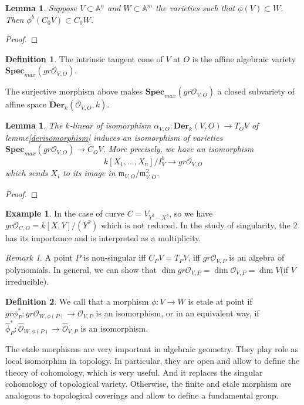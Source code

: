 \documentclass[12pt,a4paper,english]{article}
\theoremstyle{plain}
\newtheorem{lem}[thm]{Lemma}
\theoremstyle{definition}
\newtheorem{defi}{Definition}
\newtheorem*{example}{Example}
\theoremstyle{remark}
\newtheorem*{rem}{Remark}
\newcommand{\spm}{\mathbf{Spec}_{max}}
\newcommand{\der}{\textbf{Der}}
\begin{document}
\begin{lem}
Suppose $V\subset \mathbb{A}^{n}$ and $W\subset \mathbb{A}^{m}$ the varieties such that $\phi(V)\subset W$. Then $\phi^{b}(C_{0}V)\subset C_{0}W$. 
\end{lem}
\begin{proof}

\end{proof}
\begin{defi}
The intrinsic tangent cone of $V$ at $O$ is the affine algebraic variety $\spm(gr \mathcal{O}_{V,O})$.
\end{defi}
The surjective morphism above makes    $\spm(gr \mathcal{O}_{V,O})$ a closed subvariety of affine space $\der_{k}(\mathcal{O}_{V,O},k)$. 
\begin{lem}
The $k$-linear of isomorphism $\alpha_{V,O}:\der_{k}(V,O)\rightarrow T_{O}V$ of lemme\ref{derisomorphism} induces an isomorphism of varieties $\spm(gr \mathcal{O}_{V,O})\rightarrow C_{O}V$. More precisely, we have an isomorphism 
\begin{equation*}
    k[X_{1},...,X_{n}]/I^{b}_{V}\rightarrow gr \mathcal{O}_{V,O}
\end{equation*}
which sends $X_{i}$ to its image in $\mathfrak{m}_{V,O}/\mathfrak{m}^{2}_{V,O}$.
\end{lem}
\begin{proof}

\end{proof}
\begin{example}
In the case of curve $C=V_{Y^{2}-X^{3}}$, so we have $gr \mathcal{O}_{C,O}=k[X,Y]/(Y^{2})$ which is not reduced. In the study of singularity, the 2 has its importance and is interpreted as a multiplicity.
\end{example}
\begin{rem}
A point $P$ is non-singular iff $C_{P}V=T_{P}V$, iff $gr \mathcal{O}_{V,P}$ is an algebra of polynomials. In general, we can show that $\dim gr \mathcal{O}_{V,P}=\dim \mathcal{O}_{V,P}=\dim V$(if $V$ irreducible). 
\end{rem}
\begin{defi}
We call that a morphism $\phi: V\rightarrow W$ is etale at point if $gr \phi^{*}_{P}: gr \mathcal{O}_{W, \phi(P)}\rightarrow \mathcal{O}_{V,P}$ is an isomorphism, or in an equivalent way, if $\hat{\phi}^{*}_{P}:\hat{\mathcal{O}}_{W, \phi(P)}\rightarrow \hat{\mathcal{O}}_{V,P}$ is an isomorphism.
\end{defi}
The etale morphisms are very important in algebraic geometry. They play role as local isomorphim in topology. In particular, they are open and allow to define the theory of cohomology, which is very useful. And it replaces the singular cohomology of topological variety. Otherwise, the finite and etale morphism are analogous to topological coverings and allow to define a fundamental group.  
\end{document}
